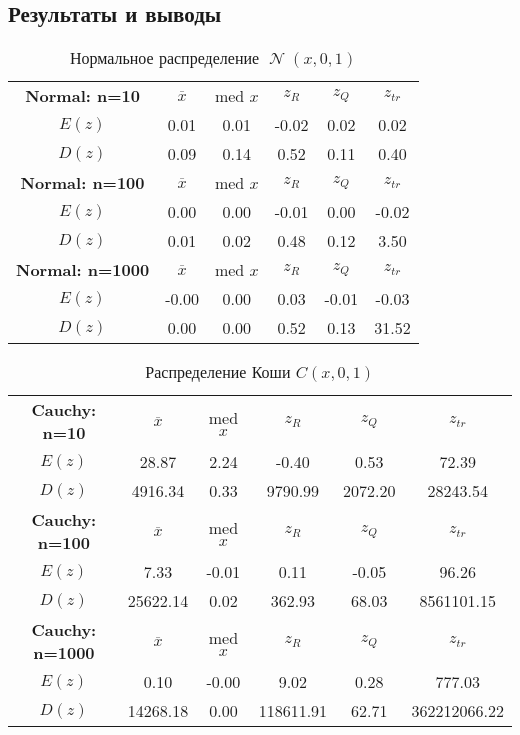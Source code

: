 \documentclass[14pt]{extarticle}
\DeclareMathOperator{\normal}{\mathcal{N}} %
\begin{document}
\subsection{Результаты и выводы}

\begin{table}[htbp]
    \centering
    \begin{tabular}{|c|c|c|c|c|c|}
        \toprule
        \textbf{Normal: n=10} & \(\overline{x}\) & med \(x\) & \(z_R\) & \(z_Q\) & \(z_{tr}\)\\
        \(E(z)\) & 0.01 & 0.01 & -0.02 & 0.02 & 0.02  \\
        \(D(z)\) &  0.09 & 0.14 & 0.52 & 0.11 & 0.40 \\
        \midrule
  	\textbf{Normal: n=100} & \(\overline{x}\) & med \(x\) & \(z_R\) & \(z_Q\) & \(z_{tr}\)\\
        \(E(z)\) & 0.00 & 0.00 & -0.01 & 0.00 & -0.02   \\
        \(D(z)\) & 0.01 & 0.02 & 0.48 & 0.12 & 3.50\\
        \midrule
	\textbf{Normal: n=1000} & \(\overline{x}\) & med \(x\) & \(z_R\) & \(z_Q\) & \(z_{tr}\)\\
        \(E(z)\) & -0.00 & 0.00 & 0.03 & -0.01 & -0.03  \\
        \(D(z)\) &  0.00 & 0.00 & 0.52 & 0.13 & 31.52 \\
        \toprule
    \end{tabular}
    \caption{Нормальное распределение \(\normal(x, 0, 1)\)}
    \label{tab:cauchy_t}
\end{table}

\begin{table}[htbp]
    \centering
    \begin{tabular}{|c|c|c|c|c|c|}
        \toprule
        \textbf{Cauchy: n=10} & \(\overline{x}\) & med \(x\) & \(z_R\) & \(z_Q\) & \(z_{tr}\)\\
        \(E(z)\) & 28.87 & 2.24 & -0.40 & 0.53 & 72.39  \\
        \(D(z)\) & 4916.34 & 0.33 & 9790.99 & 2072.20 & 28243.54 \\
        \midrule
  	\textbf{Cauchy: n=100} & \(\overline{x}\) & med \(x\) & \(z_R\) & \(z_Q\) & \(z_{tr}\)\\
        \(E(z)\) & 7.33 & -0.01 & 0.11 & -0.05 & 96.26    \\
        \(D(z)\) & 25622.14 & 0.02 & 362.93 & 68.03 & 8561101.15 \\
        \midrule
	\textbf{Cauchy: n=1000} & \(\overline{x}\) & med \(x\) & \(z_R\) & \(z_Q\) & \(z_{tr}\)\\
        \(E(z)\) & 0.10 & -0.00 & 9.02 & 0.28 & 777.03 \\
        \(D(z)\) & 14268.18 & 0.00 & 118611.91 & 62.71 & 362212066.22 \\
        \toprule
    \end{tabular}
    \caption{Распределение Коши \(C(x, 0, 1)\)}
    \label{tab:cauchy_t}
\end{table}
\end{document}
